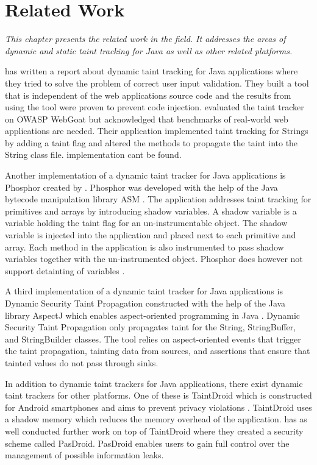 \chapter{Related Work}
\label{RW}
\textit{This chapter presents the related work in the field. It addresses the areas of dynamic and static taint tracking for Java as well as other related platforms.}

\textcite{Haldar} has written a report about dynamic taint tracking for Java applications where they tried to solve the problem of correct user input validation. They built a tool that is independent of the web applications source code and the results from using the tool were proven to prevent code injection. \textcite{Haldar} evaluated the taint tracker on OWASP WebGoat \parencite{webgoat} but acknowledged that benchmarks of real-world web applications are needed. Their application implemented taint tracking for Strings by adding a taint flag and altered the methods to propagate the taint into the String class file. \textcite{Haldar} implementation cant be found.

Another implementation of a dynamic taint tracker for Java applications is Phosphor \parencite{phosphor} created by \textcite{BellJ.2014PIdd}. Phosphor was developed with the help of the Java bytecode manipulation library ASM \parencite{asm}. The application addresses taint tracking for primitives and arrays by introducing shadow variables. A shadow variable is a variable holding the taint flag for an un-instrumentable object. The shadow variable is injected into the application and placed next to each primitive and array. Each method in the application is also instrumented to pass shadow variables together with the un-instrumented object. Phosphor does however not support detainting of variables \parencite{BellJ.2014PIdd}. 

A third implementation of a dynamic taint tracker for Java applications is Dynamic Security Taint Propagation \parencite{securityTaint} constructed with the help of the Java library AspectJ which enables aspect-oriented programming in Java \parencite{aspectj}. Dynamic Security Taint Propagation only propagates taint for the String, StringBuffer, and StringBuilder classes. The tool relies on aspect-oriented events that trigger the taint propagation, tainting data from sources, and assertions that ensure that tainted values do not pass through sinks.

In addition to dynamic taint trackers for Java applications, there exist dynamic taint trackers for other platforms. One of these is TaintDroid which is constructed for Android smartphones and aims to prevent privacy violations \parencite{EnckWilliam2014Taif}. TaintDroid uses a shadow memory which reduces the memory overhead of the application. \textcite{HsiaoS.W.2014PRse} has as well conducted further work on top of TaintDroid where they created a security scheme called PasDroid. PasDroid enables users to gain full control over the management of possible information leaks.

